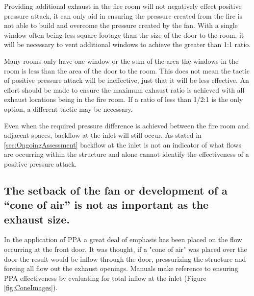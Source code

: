 \documentclass{article}
\begin{document}
Providing additional exhaust in the fire room will not negatively effect positive pressure attack, it can only aid in ensuring the pressure created from the fire is not able to build and overcome the pressure created by the fan. With a single window often being less square footage than the size of the door to the room, it will be necessary to vent additional windows to achieve the greater than 1:1 ratio. 

Many rooms only have one window or the sum of the area the windows in the room is less than the area of the door to the room. This does not mean the tactic of positive pressure attack will be ineffective, just that it will be less effective. An effort should be made to ensure the maximum exhaust ratio is achieved with all exhaust locations being in the fire room. If a ratio of less than 1/2:1 is the only option, a different tactic may be necessary. 

Even when the required pressure difference is achieved between the fire room and adjacent spaces, backflow at the inlet will still occur. As stated in \ref{sec:OngoingAssessment} backflow at the inlet is not an indicator of what flows are occurring within the structure and alone cannot identify the effectiveness of a positive pressure attack.

\subsection{The setback of the fan or development of a “cone of air” is not as important as the exhaust size.}
In the application of PPA a great deal of emphasis has been placed on the flow occurring at the front door. It was thought, if a "cone of air" was placed over the door the result would be inflow through the door, pressurizing the structure and forcing all flow out the exhaust openings. Manuals make reference to ensuring PPA effectiveness by evaluating for total inflow at the inlet (Figure \ref{fig:ConeImages}).
\end{document}
